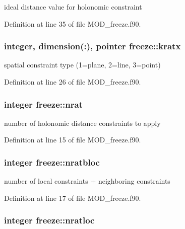 ideal distance value for holonomic constraint 



Definition at line 35 of file M\-O\-D\-\_\-freeze.\-f90.

\hypertarget{classfreeze_a9e149f0f2792e501695dc2e1e1680eaf}{
\subsubsection[{kratx}]{\setlength{\rightskip}{0pt plus 5cm}integer, dimension(\-:), pointer freeze\-::kratx}}\label{classfreeze_a9e149f0f2792e501695dc2e1e1680eaf}


spatial constraint type (1=plane, 2=line, 3=point) 



Definition at line 26 of file M\-O\-D\-\_\-freeze.\-f90.

\hypertarget{classfreeze_a9e857107771fcd2a9f3daebff0b73e98}{
\subsubsection[{nrat}]{\setlength{\rightskip}{0pt plus 5cm}integer freeze\-::nrat}}\label{classfreeze_a9e857107771fcd2a9f3daebff0b73e98}


number of holonomic distance constraints to apply 



Definition at line 15 of file M\-O\-D\-\_\-freeze.\-f90.

\hypertarget{classfreeze_a1afad11947f026c8f2d2203203f4adf5}{
\subsubsection[{nratbloc}]{\setlength{\rightskip}{0pt plus 5cm}integer freeze\-::nratbloc}}\label{classfreeze_a1afad11947f026c8f2d2203203f4adf5}


number of local constraints + neighboring constraints 



Definition at line 17 of file M\-O\-D\-\_\-freeze.\-f90.

\hypertarget{classfreeze_ad3fc5db048f9d03dbe422ebd1c656f40}{
\subsubsection[{nratloc}]{\setlength{\rightskip}{0pt plus 5cm}integer freeze\-::nratloc}}\label{classfreeze_ad3fc5db048f9d03dbe422ebd1c656f40}


